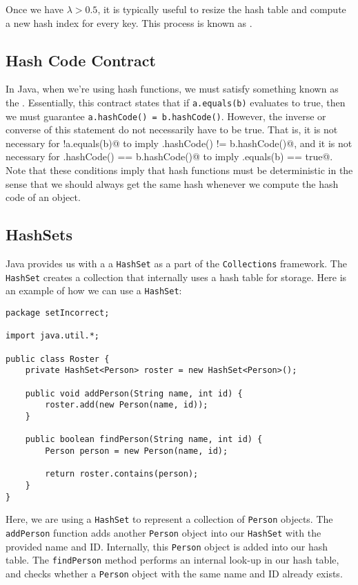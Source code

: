 Once we have $\lambda > 0.5$, it is typically useful to resize the hash table and compute a new hash index for every key. This process is known as .

\subsection{Hash Code Contract}

In Java, when we're using hash functions, we must satisfy something known as the . Essentially, this contract states that if \verb!a.equals(b)! evaluates to true, then we must guarantee \verb!a.hashCode() = b.hashCode()!. However, the inverse or converse of this statement do not necessarily have to be true. That is, it is not necessary for \verb@!a.equals(b)@ to imply \verb@a.hashCode() != b.hashCode()@, and it is not necessary for \verb@a.hashCode() == b.hashCode()@ to imply \verb@a.equals(b) == true@. \\

Note that these conditions imply that hash functions must be deterministic in the sense that we should always get the same hash whenever we compute the hash code of an object. 

\subsection{HashSets}

Java provides us with a a \verb!HashSet! as a part of the \verb!Collections! framework. The \verb!HashSet! creates a collection that internally uses a hash table for storage. Here is an example of how we can use a \verb!HashSet!:

\begin{lstlisting}
package setIncorrect;

import java.util.*;

public class Roster {
	private HashSet<Person> roster = new HashSet<Person>();

	public void addPerson(String name, int id) {
		roster.add(new Person(name, id));
	}

	public boolean findPerson(String name, int id) {
		Person person = new Person(name, id);
		
		return roster.contains(person);
	}
}
\end{lstlisting}

Here, we are using a \verb!HashSet! to represent a collection of \verb!Person! objects. The \verb!addPerson! function adds another \verb!Person! object into our \verb!HashSet! with the provided name and ID. Internally, this \verb!Person! object is added into our hash table. The \verb!findPerson! method performs an internal look-up in our hash table, and checks whether a \verb!Person! object with the same name and ID already exists. \\

